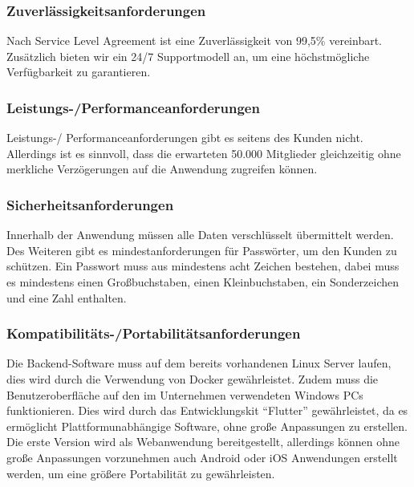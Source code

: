 \subsubsection{Zuverlässigkeitsanforderungen}
Nach Service Level Agreement ist eine Zuverlässigkeit von 99,5\% vereinbart.
Zusätzlich bieten wir ein 24/7 Supportmodell an, um eine höchstmögliche Verfügbarkeit zu garantieren.

\subsubsection{Leistungs-/Performanceanforderungen}
Leistungs-/ Performanceanforderungen gibt es seitens des Kunden nicht.
Allerdings ist es sinnvoll, dass die erwarteten 50.000 Mitglieder gleichzeitig ohne merkliche Verzögerungen auf
die Anwendung zugreifen können.

\subsubsection{Sicherheitsanforderungen}
Innerhalb der Anwendung müssen alle Daten verschlüsselt übermittelt werden.
Des Weiteren gibt es mindestanforderungen für Passwörter, um den Kunden zu schützen.
Ein Passwort muss aus mindestens acht Zeichen bestehen, dabei muss es mindestens einen Großbuchstaben, einen Kleinbuchstaben,
ein Sonderzeichen und eine Zahl enthalten.

\subsubsection{Kompatibilitäts-/Portabilitätsanforderungen}
Die Backend-Software muss auf dem bereits vorhandenen Linux Server laufen, dies wird durch die Verwendung
von Docker gewährleistet.
Zudem muss die Benutzeroberfläche auf den im Unternehmen verwendeten Windows PCs funktionieren.
Dies wird durch das Entwicklungskit \enquote{Flutter} gewährleistet, da es ermöglicht Plattformunabhängige Software,
ohne große Anpassungen zu erstellen.
Die erste Version wird als Webanwendung bereitgestellt, allerdings können ohne große Anpassungen vorzunehmen
auch Android oder iOS Anwendungen erstellt werden, um eine größere Portabilität zu gewährleisten.